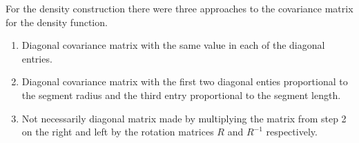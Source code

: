 \documentclass[11pt,a4paper]{article}
\numberwithin{equation}{section}
\theoremstyle{plain}
\theoremstyle{definition}
\theoremstyle{remark}
\begin{document}
For the density construction there were three approaches to the covariance matrix for the density function.

\begin{enumerate}
	\item Diagonal covariance matrix with the same value in each of the diagonal entries.
	\item Diagonal covariance matrix with the first two diagonal enties proportional to the segment radius and the third entry proportional to the segment length.
	\item Not necessarily diagonal matrix made by multiplying the matrix from step 2 on the right and left by the rotation matrices $R$ and $R^{-1}$ respectively.  
\end{enumerate}	
	

    
\end{document}

